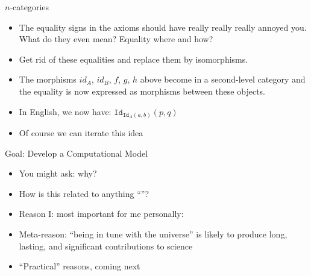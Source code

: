 \documentclass[11pt]{beamer}
\newcommand{\red}[1]{{\color{red}{#1}}}
\newcommand{\blue}[1]{{\color{blue}{#1}}}
\begin{document}
\begin{frame}{$n$-categories}

\begin{itemize}

\vfill\item The equality signs in the axioms should have really really
  really annoyed you. What do they even mean? Equality where and how?

\vfill\item Get rid of these equalities and replace them by isomorphisms.

\vfill\item The morphisms $\mathit{id}_A$, $\mathit{id}_B$, $f$, $g$, $h$
above become \red{objects} in a second-level category and the equality is now
expressed as morphisms between these objects.

\pause 

\vfill\item In English, we now have: $\texttt{Id}_{\texttt{Id}_A(a,b)}(p,q)$

\vfill\item Of course we can iterate this idea

\end{itemize}

\vfill

\end{frame}

\begin{frame}{Goal: Develop a Computational Model}

\begin{itemize}

\vfill\item You might ask: why? 

\vfill\item How is this related to anything ``\red{useful}''?

\vfill\item Reason I: most important for me personally: \red{Aesthetics!}
\blue{(Symmetry)}

\vfill\item Meta-reason: ``being in tune with the universe'' is likely to
produce long, lasting, and significant contributions to science

\vfill\item ``Practical'' reasons, coming next

\end{itemize}

\vfill

\end{frame}
\end{document}
